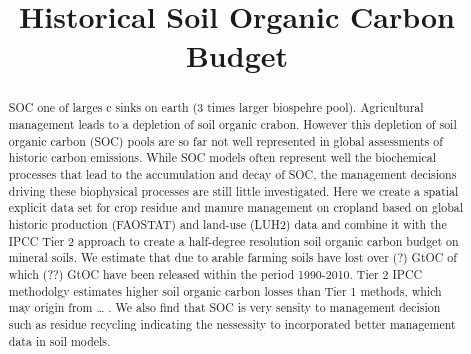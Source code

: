 \documentclass[gc, manuscript]{copernicus}
\begin{document}
\title{Historical Soil Organic Carbon Budget}














\received{}
\pubdiscuss{} %
\revised{}
\accepted{}
\published{}




\maketitle


\begin{abstract}
SOC one of larges c sinks on earth (3 times larger biospehre pool).
Agricultural management leads to a depletion of soil organic crabon.
However this depletion of soil organic carbon (SOC) pools are so far not
well represented in global assessments of historic carbon emissions.
While SOC models often represent well the biochemical processes that
lead to the accumulation and decay of SOC, the management decisions
driving these biophysical processes are still little investigated. Here
we create a spatial explicit data set for crop residue and manure
management on cropland based on global historic production (FAOSTAT) and
land-use (LUH2) data and combine it with the IPCC Tier 2 approach to
create a half-degree resolution soil organic carbon budget on mineral
soils. We estimate that due to arable farming soils have lost over (?)
GtOC of which (??) GtOC have been released within the period 1990-2010.
Tier 2 IPCC methodolgy estimates higher soil organic carbon losses than
Tier 1 methods, which may origin from \ldots{} . We also find that SOC
is very sensity to management decision such as residue recycling
indicating the nessessity to incorporated better management data in soil
models.
\end{abstract}
\end{document}
